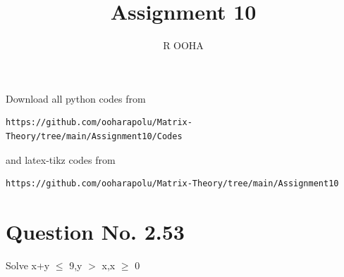 \documentclass[journal,12pt,twocolumn]{IEEEtran}
\begin{document}
     \def\rightbox#1{\makebox[0in][r]{#1}}
     \def\centbox#1{\makebox[0in]{#1}}
     \def\topbox#1{\raisebox{-\baselineskip}[0in][0in]{#1}}
     \def\midbox#1{\raisebox{-0.5\baselineskip}[0in][0in]{#1}}
\vspace{3cm}
\title{Assignment 10}
\author{R OOHA}
\maketitle
\newpage
\bigskip
\renewcommand{\thefigure}{\theenumi}
\renewcommand{\thetable}{\theenumi}
Download all python codes from 
\begin{lstlisting}
https://github.com/ooharapolu/Matrix-Theory/tree/main/Assignment10/Codes
\end{lstlisting}
%
and latex-tikz codes from 
%
\begin{lstlisting}
https://github.com/ooharapolu/Matrix-Theory/tree/main/Assignment10
\end{lstlisting}
%
\section{Question No. 2.53}
Solve x+y $\leq$ 9,y $>$ x,x $\geq$ 0
\end{document}
